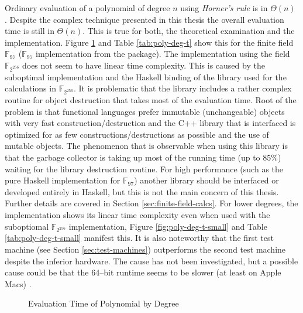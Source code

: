%
%
\label{sec:comp-complexity}

Ordinary evaluation of a polynomial of degree $n$ using \emph{Horner's rule} is
in $\Theta(n)$ \cite{cormen01}. Despite the complex technique presented in this
thesis the overall evaluation time is still in $\Theta(n)$. This is true for
both, the theoretical examination and the implementation. Figure
\ref{fig:poly-deg-t} and Table \ref{tab:poly-deg-t} show this for the finite
field $\mathbb{F}_{97}$ ($\mathbb{F}_{97}$ implementation from the
\JWTLhaskellForMaths{} package). The implementation using the field
$\mathbb{F}_{2^{256}}$ does not seem to have linear time complexity. This is
caused by the suboptimal implementation and the Haskell binding of the library
used for the calculations in $\mathbb{F}_{2^{256}}$. It is problematic that the
library includes a rather complex routine for object destruction that takes most
of the evaluation time.  Root of the problem is that functional languages prefer
immutable (unchangeable) objects with very fast construction/destruction and the
C++ library that is interfaced is optimized for as few
constructions/destructions as possible and the use of mutable objects. The
phenomenon that is observable when using this library is that the garbage
collector is taking up most of the running time (up to $85\%$) waiting for the
library destruction routine. For high performance (such as the pure Haskell
implementation for $\mathbb{F}_{97}$) another library should be interfaced or
developed entirely in Haskell, but this is not the main concern of this thesis.
Further details are covered in Section \ref{sec:finite-field-calcs}. For lower
degrees, the implementation shows its linear time complexity even when used with
the suboptiomal $\mathbb{F}_{2^{256}}$ implementation, Figure
\ref{fig:poly-deg-t-small} and Table \ref{tab:poly-deg-t-small} manifest this.
It is also noteworthy that the first test machine (see Section
\ref{sec:test-machines}) outperforms the second test machine despite the
inferior hardware. The cause has not been investigated, but a possible cause
could be that the 64--bit \JWTghc{} runtime seems to be slower (at least on
Apple Macs) \cite{lentczner11}.


\begin{figure}[ht]
  \centering
  
  \caption{Evaluation Time of Polynomial by Degree}
  \label{fig:poly-deg-t}
\end{figure}

